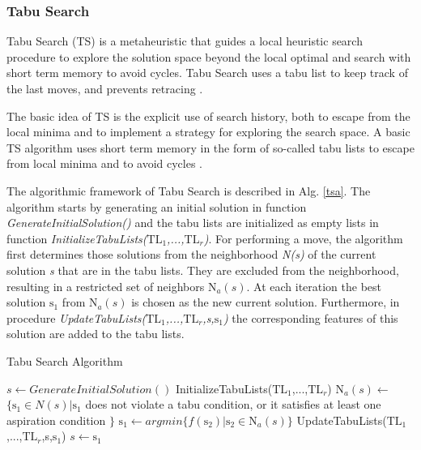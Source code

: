 \documentclass{bmcart}
\begin{document}
\subsubsection{Tabu Search}

Tabu Search (TS) is a metaheuristic that guides a local heuristic search procedure to explore the solution space beyond the local optimal and search with short term memory to avoid cycles. Tabu Search uses a  tabu list to keep track of the last  moves, and prevents retracing \citep{Glover1986}.

The basic idea of TS is the explicit use of search history, both to escape
from the local minima and to implement a strategy for exploring the search space.
A basic TS algorithm uses short term memory in the form of so-called
tabu lists to escape from local minima and to avoid cycles \citep{Tobergte2013}.

The algorithmic framework of Tabu Search is described in Alg. \ref{tsa}.  The algorithm starts by generating an initial solution in function \textit{GenerateInitialSolution()} and the tabu lists are initialized as empty lists in function \textit{InitializeTabuLists($\mbox{TL}_1$,...,$\mbox{TL}_r$)}. For performing a move, the algorithm first determines those solutions from the neighborhood \textit{N(s)} of the current solution \textit{s} that are in the tabu lists. They are excluded from the neighborhood, resulting in a restricted set of neighbors \textit{$\mbox{N}_a(s)$}. At each iteration the best solution \textit{$\mbox{s}_1$} from \textit{$\mbox{N}_a(s)$} is chosen as the new current solution. Furthermore, in procedure \textit{UpdateTabuLists($\mbox{TL}_1$,...,$\mbox{TL}_r$,s,$\mbox{s}_1$)} the corresponding features of this solution are added to the tabu lists.


\begin{algorithm}[h]
  \caption{Tabu Search Algorithm}\label{tsa}
  \begin{algorithmic}[2]
    
    \State $s\gets GenerateInitialSolution()$
    \State InitializeTabuLists($\mbox{TL}_1$,...,$\mbox{TL}_r$)
    \State $\mbox{N}_a(s)\gets$ $\{\mbox{s}_1 \in N(s) |\mbox{s}_1$ does not violate a tabu condition, or it satisfies at least one aspiration condition $\}$ 
    \State $\mbox{s}_1\gets argmin\{f(\mbox{s}_2)|\mbox{s}_2 \in \mbox{N}_a(s) \}$
    \State UpdateTabuLists($\mbox{TL}_1$,...,$\mbox{TL}_r$,s,$\mbox{s}_1$)
    \State $s\gets \mbox{s}_1$
    \EndWhile
      
  \end{algorithmic}
\end{algorithm}
\end{document}
